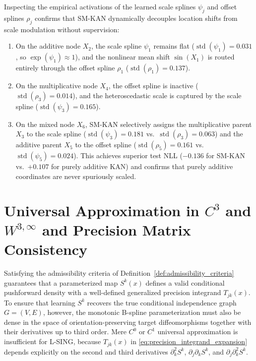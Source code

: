 Inspecting the empirical activations of the learned scale splines $\psi_j$ and offset splines $\rho_j$ confirms that SM-KAN dynamically decouples location shifts from scale modulation without supervision:
\begin{enumerate}
    \item On the additive node $X_2$, the scale spline $\psi_1$ remains flat ($\operatorname{std}(\psi_1) = 0.031$, so $\exp(\psi_1) \approx 1$), and the nonlinear mean shift $\sin(X_1)$ is routed entirely through the offset spline $\rho_1$ ($\operatorname{std}(\rho_1) = 0.137$).
    \item On the multiplicative node $X_4$, the offset spline is inactive ($\operatorname{std}(\rho_3) = 0.014$), and the heteroscedastic scale is captured by the scale spline ($\operatorname{std}(\psi_3) = 0.165$).
    \item On the mixed node $X_6$, SM-KAN selectively assigns the multiplicative parent $X_3$ to the scale spline ($\operatorname{std}(\psi_3) = 0.181$ vs.\ $\operatorname{std}(\rho_3) = 0.063$) and the additive parent $X_5$ to the offset spline ($\operatorname{std}(\rho_5) = 0.161$ vs.\ $\operatorname{std}(\psi_5) = 0.024$). This achieves superior test NLL ($-0.136$ for SM-KAN vs.\ $+0.107$ for purely additive KAN) and confirms that purely additive coordinates are never spuriously scaled.
\end{enumerate}

\section{Universal Approximation in \texorpdfstring{$C^3$}{C3} and \texorpdfstring{$W^{3,\infty}$}{W\^{}\{3,infty\}} and Precision Matrix Consistency}
\label{app:c3_universal_approximation}

Satisfying the admissibility criteria of Definition~\ref{def:admissibility_criteria} guarantees that a parameterized map $S^k(x)$ defines a valid conditional pushforward density with a well-defined generalized precision integrand $T_{jk}(x)$. To ensure that learning $S^k$ recovers the true conditional independence graph $G = (V, E)$, however, the monotonic B-spline parameterization must also be dense in the space of orientation-preserving target diffeomorphisms together with their derivatives up to third order. Mere $C^0$ or $C^1$ universal approximation is insufficient for L-SING, because $T_{jk}(x)$ in \eqref{eq:precision_integrand_expansion} depends explicitly on the second and third derivatives $\partial_k^2 S^k$, $\partial_j \partial_k S^k$, and $\partial_j \partial_k^2 S^k$.

